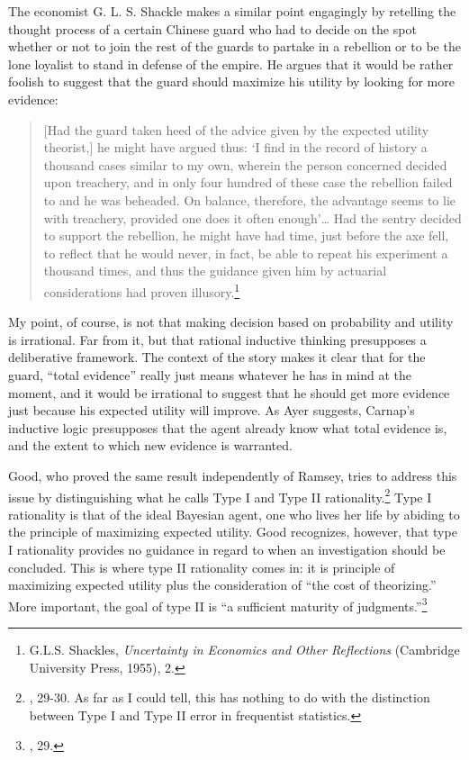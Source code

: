 The economist G. L. S. Shackle makes a similar point engagingly by
retelling the thought process of a certain Chinese guard who had to
decide on the spot whether or not to join the rest of the guards to
partake in a rebellion or to be the lone loyalist to stand in defense of
the empire. He argues that it would be rather foolish to suggest that
the guard should maximize his utility by looking for more evidence:

\begin{quote}
{[}Had the guard taken heed of the advice given by the expected utility
theorist,{]} he might have argued thus: `I find in the record of history
a thousand cases similar to my own, wherein the person concerned decided
upon treachery, and in only four hundred of these case the rebellion
failed to and he was beheaded. On balance, therefore, the advantage
seems to lie with treachery, provided one does it often enough'\ldots{}
Had the sentry decided to support the rebellion, he might have had time,
just before the axe fell, to reflect that he would never, in fact, be
able to repeat his experiment a thousand times, and thus the guidance
given him by actuarial considerations had proven illusory.\footnote{G.L.S.
  Shackles, \emph{Uncertainty in Economics and Other Reflections}
  (Cambridge University Press, 1955), 2.}
\end{quote}

My point, of course, is not that making decision based on probability
and utility is irrational. Far from it, but that rational
inductive thinking presupposes a deliberative framework. The context of
the story makes it clear that for the guard, ``total evidence'' really
just means whatever he has in mind at the moment, and it would be
irrational to suggest that he should get more evidence just because his
expected utility will improve. As Ayer suggests, Carnap's inductive logic presupposes that the agent already know what total evidence is, and the extent to which new evidence is warranted.

Good, who proved the same result independently of Ramsey, tries to
address this issue by distinguishing what he calls Type I and Type II
rationality.\footnote{\cite{goodthinking}, 29-30. As far as I
  could tell, this has nothing to do with the distinction between Type I
  and Type II error in frequentist statistics.} Type I rationality is
that of the ideal Bayesian agent, one who lives her life by abiding to
the principle of maximizing expected utility. Good recognizes, however,
that type I rationality provides no guidance in regard to when an
investigation should be concluded. This is where type II rationality
comes in: it is principle of maximizing expected utility plus the
consideration of ``the cost of theorizing.'' More important, the goal of
type II is ``a sufficient maturity of judgments.''\footnote{\cite{goodthinking}, 29.}

